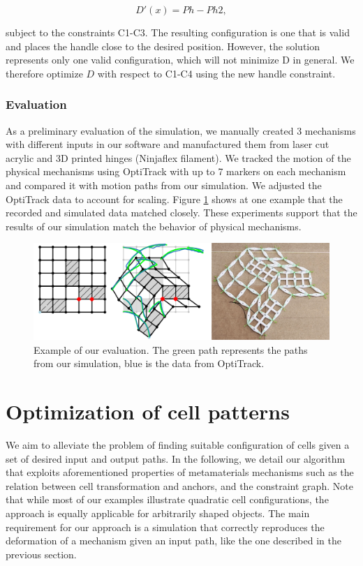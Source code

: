 $$D\prime\left(x\right)=Ph-Ph2,$$

subject to the constraints C1-C3. The resulting configuration is one that is valid and places the handle close to the desired position. However, the solution represents only one valid configuration, which will not minimize D in general. We therefore optimize $D$ with respect to C1-C4 using the new handle constraint.


\subsubsection{Evaluation}

As a preliminary evaluation of the simulation, we manually created 3 mechanisms with different inputs in our software and manufactured them from laser cut acrylic and 3D printed hinges (Ninjaflex filament). We tracked the motion of the physical mechanisms using OptiTrack with up to 7 markers on each mechanism and compared it with motion paths from our simulation. We adjusted the OptiTrack data to account for scaling. Figure \ref{fig:12-optitrack-evaluation} shows at one example that the recorded and simulated data matched closely. These experiments support that the results of our simulation match the behavior of physical mechanisms.

\begin{figure} [h]
    \includegraphics[width=\textwidth]{chapters/understanding-metamaterial-mechanisms-FIG/12-optitrack-evaluation.png}
    \caption[Short figure name.]{Example of our evaluation. The green path represents the paths from our simulation, blue is the data from OptiTrack.
    \label{fig:12-optitrack-evaluation}}
\end{figure}


\section{Optimization of cell patterns}
\label{section:optimization}

We aim to alleviate the problem of finding suitable configuration of cells given a set of desired input and output paths. In the following, we detail our algorithm that exploits aforementioned properties of metamaterials mechanisms such as the relation between cell transformation and anchors, and the constraint graph. Note that while most of our examples illustrate quadratic cell configurations, the approach is equally applicable for arbitrarily shaped objects. The main requirement for our approach is a simulation that correctly reproduces the deformation of a mechanism given an input path, like the one described in the previous section.

